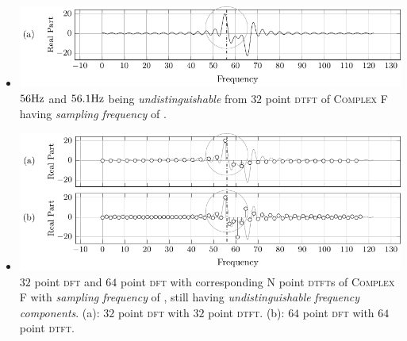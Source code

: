 \documentclass[../../course]{subfiles}
\begin{document}
\begin{itemize} [label=]
\begin{itemize} [label=]
            \item
                \begin{minipage}[b] {0.85\textwidth}
                    \vspace{6pt}
                    \centering
                     {
                        \includegraphics[height = 0.8\textheight] {tikzpics/plotDtftCloseFreq.pdf}
                    }
                     {
                        $\freqXTwo \si{Hz}$ and $\freqXThree \si{Hz}$ being \emph{undistinguishable} from $32$
                        point \textsc{dtft} of \textsc{Complex F} having \emph{sampling frequency} of
                        \sampFreqSligGreatJust.
                    }
                    \label{plt:dtftCloseFreq}
                \end{minipage}

            \item
                \begin{minipage}[b] {0.85\textwidth}
                    \vspace{6pt}
                    \centering
                     {
                        \includegraphics[height = 0.8\textheight] {tikzpics/plotDftCloseFreq.pdf}
                    }
                     {
                        $32$ point \textsc{dft} and $64$ point \textsc{dft} with corresponding \textsc{N} point
                        \textsc{dtft}s of \textsc{Complex F} with \emph{sampling frequency} of \sampFreqSligGreatJust,
                        still having \emph{undistinguishable} \emph{frequency components}.
                        (a): $32$ point \textsc{dft} with $32$ point \textsc{dtft}.
                        (b): $64$ point \textsc{dft} with $64$ point \textsc{dtft}.
                    }
                    \label{plt:dftCloseFreq}
                \end{minipage}


\end{itemize}
\end{itemize}
\end{document}
